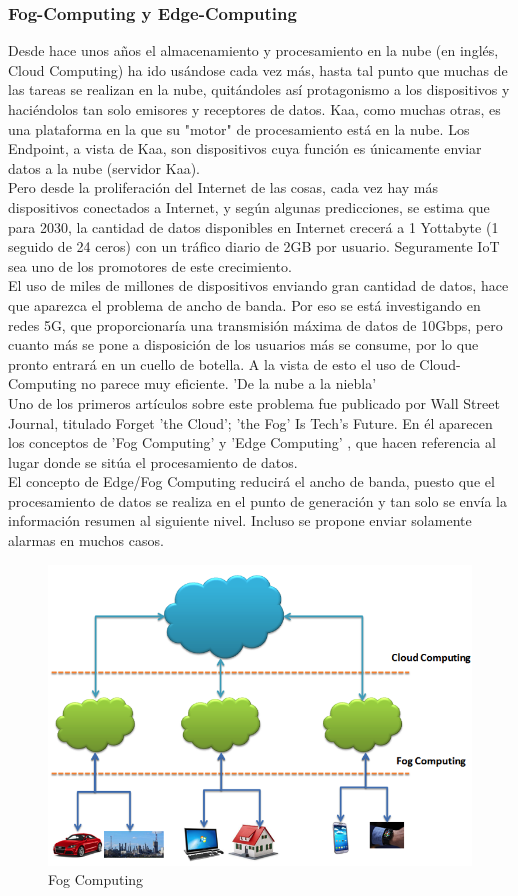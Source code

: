 \documentclass[12pt, twoside]{book}
\begin{document}
\subsubsection*{Fog-Computing y Edge-Computing}
Desde hace unos años el almacenamiento y procesamiento en la nube (en inglés, Cloud Computing) ha ido usándose cada vez más, hasta tal punto que muchas de las tareas se realizan en la nube, quitándoles así protagonismo a los dispositivos y haciéndolos tan solo emisores y receptores de datos. Kaa, como muchas otras, es una plataforma en la que su "motor" de procesamiento está en la nube. Los Endpoint, a vista de Kaa, son dispositivos cuya función es únicamente enviar datos a la nube (servidor Kaa). \\
Pero desde la proliferación del Internet de las cosas, cada vez hay más dispositivos conectados a Internet, y según algunas predicciones, se estima que para 2030, la cantidad de datos disponibles en Internet crecerá a 1 Yottabyte (1 seguido de 24 ceros) con un tráfico diario de 2GB por usuario. Seguramente IoT sea uno de los promotores de este crecimiento. \\
El uso de miles de millones de dispositivos enviando gran cantidad de datos, hace que aparezca el problema de ancho de banda. Por eso se está investigando en redes 5G, que proporcionaría una transmisión máxima de datos de 10Gbps, pero cuanto más se pone a disposición de los usuarios más se consume, por lo que pronto entrará en un cuello de botella. A la vista de esto el uso de Cloud-Computing no parece muy eficiente. 'De la nube a la niebla'\\
Uno de los primeros artículos sobre este problema fue publicado por Wall Street Journal, titulado Forget 'the Cloud'; 'the Fog' Is Tech's Future. En él aparecen los conceptos de 'Fog Computing' y 'Edge Computing' \cite{wsj}, que hacen referencia al lugar donde se sitúa el procesamiento de datos.\\
El concepto de Edge/Fog Computing reducirá el ancho de banda, puesto que el procesamiento de datos se realiza en el punto de generación y tan solo se envía la información resumen al siguiente nivel. Incluso se propone enviar solamente alarmas en muchos casos. 
\begin{figure}[H]
\centering
\includegraphics[scale=0.6]{images/fog_computing}
\caption{Fog Computing}\label{L509}
\end{figure}
\end{document}
